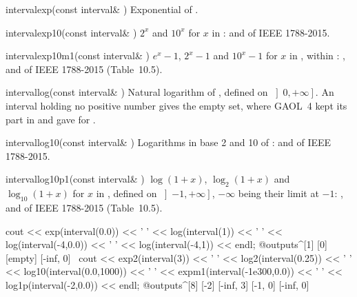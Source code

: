 \documentclass[12pt,a4paper,twoside,openright]{book}
\begin{document}
\begin{deffun}{interval}{exp}{(const interval\& )}
  Exponential of .
\end{deffun}

\begin{deffun}{interval}{exp10}{(const interval\& )}
  $2^x$ and $10^x$ for $x$ in :  and  of IEEE
  1788-2015.\newinvfive
\end{deffun}

\begin{deffun}{interval}{exp10m1}{(const interval\& )}
  $e^x-1$, $2^x-1$ and $10^x-1$ for $x$ in , within
  : ,  and  of IEEE
  1788-2015 (Table~10.5).\newinvfive
\end{deffun}

\begin{deffun}{interval}{log}{(const interval\& )}
  Natural logarithm of , defined on $\left]0,+\infty\right]$. An
  interval holding no positive number gives the empty set, where GAOL~4 kept
  its part in  and gave  for
  .\newinvfive
\end{deffun}

\begin{deffun}{interval}{log10}{(const interval\& )}
  Logarithms in base 2 and 10 of :  and  of
  IEEE 1788-2015.\newinvfive
\end{deffun}

\begin{deffun}{interval}{log10p1}{(const interval\& )}
  $\log(1+x)$, $\log_2(1+x)$ and $\log_{10}(1+x)$ for $x$ in , defined
  on $\left]-1,+\infty\right]$, $-\infty$ being their limit at $-1$:
  ,  and  of IEEE 1788-2015
  (Table~10.5).\newinvfive
\begin{example}
cout << exp(interval(0.0)) << ' ' << log(interval(1)) << ' '
     << log(interval(-4,0.0)) << ' '
     << log(interval(-4,1)) << endl;
@outputs^[1] [0] [empty] [-inf, 0]~
cout << exp2(interval(3)) << ' ' << log2(interval(0.25)) << ' '
     << log10(interval(0.0,1000)) << ' '
     << expm1(interval(-1e300,0.0)) << ' '
     << log1p(interval(-2,0.0)) << endl;
@outputs^[8] [-2] [-inf, 3] [-1, 0] [-inf, 0]~
\end{example}
\end{deffun}
\end{document}

